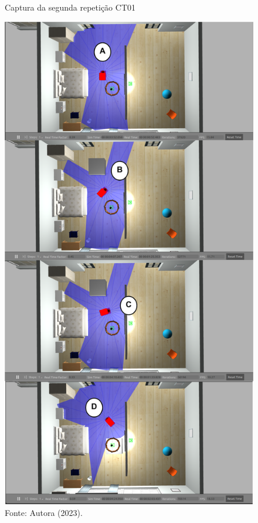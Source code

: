 \begin{figure}[H]
    \centering
    \caption{Captura da segunda repetição CT01}
    \includegraphics[scale=0.35]{ct01_2.png}
    \caption*{Fonte: Autora (2023).}
    \label{fig:ct01_2}
\end{figure}

